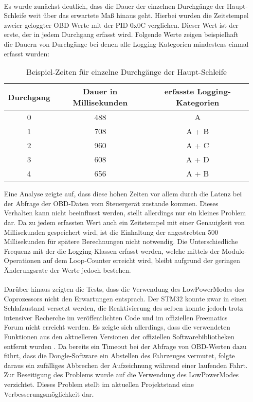 \paragraph{}
Es wurde zunächst deutlich, dass die Dauer der einzelnen Durchgänge der Haupt-Schleife weit über das erwartete Maß hinaus geht. Hierbei wurden die Zeitstempel zweier geloggter OBD-Werte mit der PID 0x0C verglichen. Dieser Wert ist der erste, der in jedem Durchgang erfasst wird. Folgende Werte zeigen beispielhaft die Dauern von Durchgänge bei denen alle Logging-Kategorien mindestens einmal erfasst wurden:
\begin{table}
  \caption{Beispiel-Zeiten für einzelne Durchgänge der Haupt-Schleife}
  \label{tab:loopTimes}

  \begin{center}
    \begin{tabular}{|c|c|c|}
    \hline
      Durchgang & Dauer in Millisekunden & erfasste Logging-Kategorien\\ \hline
      0 & 488 & A\\ \hline
      1 & 708 & A + B\\ \hline
      2 & 960 & A + C\\ \hline
      3 & 608 & A + D\\ \hline
      4 & 656 & A + B\\ \hline
    \end{tabular}
  \end{center}
\end{table}
Eine Analyse zeigte auf, dass diese hohen Zeiten vor allem durch die Latenz bei der Abfrage der OBD-Daten vom Steuergerät zustande kommen. Dieses Verhalten kann nicht beeinflusst werden, stellt allerdings nur ein kleines Problem dar. Da zu jedem erfassten Wert auch ein Zeitstempel mit einer Genauigkeit von  Millisekunden gespeichert wird, ist die Einhaltung der angestrebten 500 Millisekunden für spätere Berechnungen nicht notwendig. Die Unterschiedliche Frequenz mit der die Logging-Klassen erfasst werden, welche mittels der Modulo-Operationen auf dem Loop-Counter erreicht wird, bleibt aufgrund der geringen Änderungsrate der Werte jedoch bestehen.
\paragraph{}
Darüber hinaus zeigten die Tests, dass die Verwendung des LowPowerModes des Coprozessors nicht den Erwartungen entsprach. Der STM32 konnte zwar in einen Schlafzustand versetzt werden, die Reaktivierung des selben konnte jedoch trotz intensiver Recherche im veröffentlichten Code und im offiziellen Freematics Forum nicht erreicht werden. Es zeigte sich allerdings, dass die verwendeten Funktionen aus den aktuelleren Versionen der offiziellen Softwarebibliotheken entfernt wurden \cite{freematicsRevFeb}. Da bereits ein Timeout bei der Abfrage von OBD-Werten dazu führt, dass die Dongle-Software ein Abstellen des Fahrzeuges vermutet, folgte daraus ein zufälliges Abbrechen der Aufzeichnung während einer laufenden Fahrt. Zur Beseitigung des Problems wurde auf die Verwendung des LowPowerModes verzichtet. Dieses Problem stellt im aktuellen Projektstand eine Verbesserungsmöglichkeit dar.

